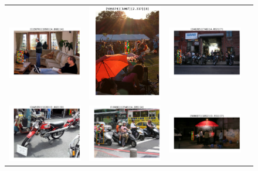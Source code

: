 \documentclass[10pt,onecolumn,letterpaper]{article}
\begin{document}
\begin{figure}[h!]
{\begin{tabular}{c|c|c|c}
\includegraphics[width=.25\linewidth,height=.15\paperwidth,keepaspectratio]{./result/rmpe/localization_errors/keypoints_breakdown/swap_1.pdf} &
\includegraphics[width=.25\linewidth,height=.15\paperwidth,keepaspectratio]{./result/rmpe/localization_errors/keypoints_breakdown/inversion_1.pdf} &
\includegraphics[width=.25\linewidth,height=.15\paperwidth,keepaspectratio]{./result/rmpe/localization_errors/keypoints_breakdown/jitter_1.pdf} \\
\includegraphics[width=.25\linewidth,height=.15\paperwidth,keepaspectratio]{./result/rmpe/localization_errors/keypoints_breakdown/miss_2.pdf} &
\includegraphics[width=.25\linewidth,height=.15\paperwidth,keepaspectratio]{./result/rmpe/localization_errors/keypoints_breakdown/swap_2.pdf} &
\includegraphics[width=.25\linewidth,height=.15\paperwidth,keepaspectratio]{./result/rmpe/localization_errors/keypoints_breakdown/inversion_2.pdf} &

\end{tabular}}
\end{figure}
\end{document}
